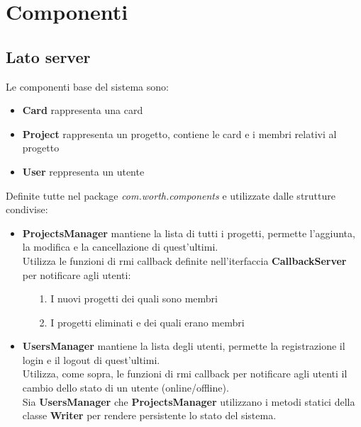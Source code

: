 \documentclass[11pt]{report}
\begin{document}
	\section{Componenti}
	
	\subsection{Lato server}
		Le componenti base del sistema sono:
		
		\begin{itemize}
			\item \textbf{Card} rappresenta una card
			
			\item \textbf{Project} rappresenta un progetto, contiene le card e i membri relativi al progetto
			
			\item \textbf{User} reppresenta un utente
		\end{itemize}
	
		Definite tutte nel package \textit{com.worth.components} e utilizzate dalle strutture condivise:
		
		\begin{itemize}
			\item \textbf{ProjectsManager} mantiene la lista di tutti i progetti, permette l'aggiunta, la modifica e la cancellazione di quest'ultimi.\\
			Utilizza le funzioni di rmi callback definite nell'iterfaccia \textbf{CallbackServer} per notificare agli utenti:
			\begin{itemize}
				\item[1.] I nuovi progetti dei quali sono membri
				\item[2.] I progetti eliminati e dei quali erano membri
			\end{itemize}
			
			\item \textbf{UsersManager} mantiene la lista degli utenti, permette la registrazione il login e il logout di quest'ultimi.\\
			Utilizza, come sopra, le funzioni di rmi callback per notificare agli utenti il cambio dello stato di un utente (online/offline).\\
			
			Sia \textbf{UsersManager} che \textbf{ProjectsManager} utilizzano i metodi statici della classe \textbf{Writer} per rendere persistente lo stato del sistema.
			
		\end{itemize}
	
\end{document}
